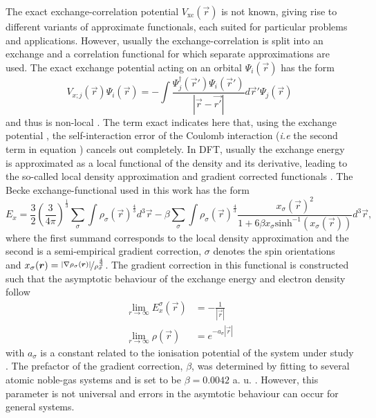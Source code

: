 The exact exchange-correlation potential $V_\text{xc}(\vec{r})$ is not known, giving rise to different variants of approximate functionals, each suited for particular problems and applications.
However, usually the exchange-correlation is split into an exchange and a correlation functional for which separate approximations are used.
The exact exchange potential acting on an orbital $\Psi_i(\vec{r})$ has the form
\begin{equation} \label{eq:HF_exch}
V_{x;j}(\vec{r})\Psi_i(\vec{r}) =-\int \frac{\Psi_j^\dagger(\vec{r}') \Psi_i(\vec{r}')}{\left|\vec{r}-\vec{r'}\right|} d\vec{r}' \Psi_j(\vec{r})
\end{equation}
and thus is non-local \cite{Holthausen}.
The term exact indicates here that, using the exchange potential , the self-interaction error of the Coulomb interaction (\textit{i.e} the second term in equation ) cancels out completely.
In DFT, usually the exchange energy is approximated as a local functional of the density and its derivative, leading to the so-called local density approximation and gradient corrected functionals \cite{baerRSH}.
The Becke \cite{blyp} exchange-functional used in this work has the form
\begin{equation} \label{eq:blypXC}
E_x=\frac 32 \left(\frac{3}{4\pi}\right)^\frac 13 \sum_\sigma \int \rho_\sigma(\vec{r})^\frac 43 d^3\vec{r} 
-\beta \sum_\sigma \int \rho_\sigma(\vec{r})^\frac 43 \frac{x_\sigma(\vec{r})^2}{1+6\beta x_\sigma \text{sinh}^{-1}( x_\sigma (\vec{r}))} d^3\vec{r},
\end{equation}
where the first summand corresponds to the local density approximation and the second is a semi-empirical gradient correction, $\sigma$ denotes the spin orientations and $x_\sigma(\vec{r})=\nicefrac{|\nabla \rho_\sigma(\vec{r})|}{\rho_\sigma^\frac 43}$. 
The gradient correction in this functional is constructed such that the asymptotic behaviour of the exchange energy and electron density follow
\begin{align} \label{eq:dftAsympt}
  \lim_{r\rightarrow\infty} E_x^\sigma(\vec{r}) & =-\frac{1}{|\vec{r}|} \\
  \lim_{r\rightarrow\infty} \rho(\vec{r}) & =e^{-a_\sigma |\vec{r}|}
\end{align}
with $a_\sigma$ is a constant related to the ionisation potential of the system under study \cite{blyp}.
The prefactor of the gradient correction, $\beta$, was determined by fitting to several atomic noble-gas systems and is set to be $\beta=0.0042$ a. u. \cite{blyp}.
However, this parameter is not universal and errors in the asymtotic behaviour  can occur for general systems.


